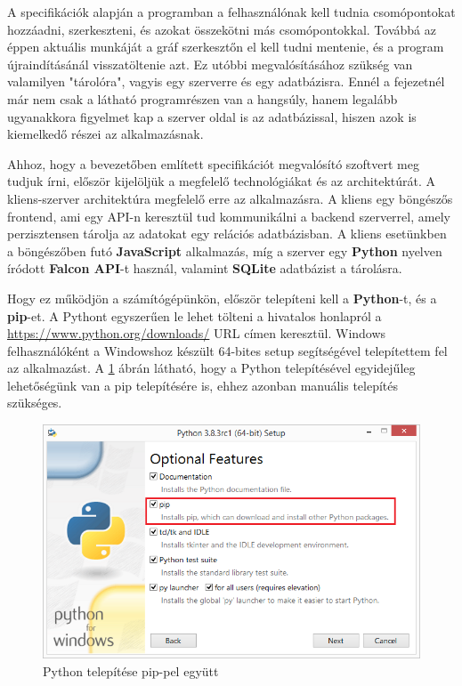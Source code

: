 

A specifikációk alapján a programban a felhasználónak kell tudnia csomópontokat hozzáadni, szerkeszteni, és azokat összekötni más csomópontokkal. Továbbá az éppen aktuális munkáját a gráf szerkesztőn el kell tudni mentenie, és a program újraindításánál visszatöltenie azt. Ez utóbbi megvalósításához szükség van valamilyen "tárolóra", vagyis egy szerverre és egy adatbázisra. Ennél a fejezetnél már nem csak a látható programrészen van a hangsúly, hanem legalább ugyanakkora figyelmet kap a szerver oldal is az adatbázissal, hiszen azok is kiemelkedő részei az alkalmazásnak.


Ahhoz, hogy a bevezetőben említett specifikációt megvalósító szoftvert meg tudjuk írni, először kijelöljük a megfelelő technológiákat és az architektúrát. A kliens-szerver architektúra megfelelő erre az alkalmazásra. A kliens egy böngészős frontend, ami egy API-n keresztül tud kommunikálni a backend szerverrel, amely perzisztensen tárolja az adatokat egy relációs adatbázisban. A kliens esetünkben a böngészőben futó \textbf{JavaScript} alkalmazás, míg a szerver egy \textbf{Python} nyelven íródott \textbf{Falcon API}-t használ, valamint \textbf{SQLite} adatbázist a tárolásra.
 
Hogy ez működjön a számítógépünkön, először telepíteni kell a \textbf{Python}-t, és a \textbf{pip}-et. A Pythont egyszerűen le lehet tölteni a hivatalos honlapról a \url{https://www.python.org/downloads/} URL címen keresztül. Windows felhasználóként a Windowshoz készült 64-bites setup segítségével telepítettem fel az alkalmazást. A \ref{fig:pyt1} ábrán látható, hogy a Python telepítésével egyidejűleg lehetőségünk van a pip telepítésére is, ehhez azonban manuális telepítés szükséges.

\begin{figure}[h]
\centering
\includegraphics[scale=0.7]{images/python1.png}
\caption{Python telepítése pip-pel együtt}
\label{fig:pyt1}
\end{figure}

